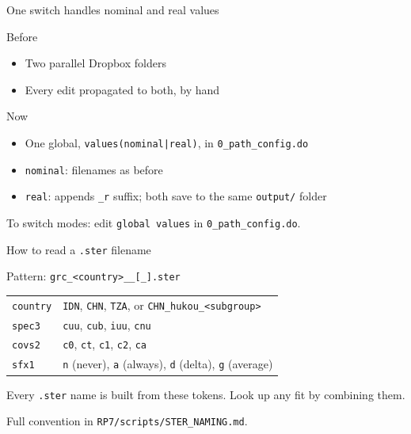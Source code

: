 \documentclass[10pt,aspectratio=169]{beamer}
\newcommand{\code}[1]{\texttt{\small #1}}
\begin{document}
\begin{frame}{One switch handles nominal and real values}

\textcolor{cktgray}{Before}
\begin{itemize}\setlength\itemsep{2pt}
    \item Two parallel Dropbox folders
    \item Every edit propagated to both, by hand
\end{itemize}

\medskip
\textcolor{cktblue}{Now}
\begin{itemize}\setlength\itemsep{2pt}
    \item One global, \code{values(nominal|real)}, in \code{0\_path\_config.do}
    \item \code{nominal}: filenames as before
    \item \code{real}: appends \code{\_r} suffix; both save to the same \code{output/} folder
\end{itemize}

\medskip
\textcolor{cktblue}{To switch modes}: edit \code{global values} in \code{0\_path\_config.do}.

\end{frame}

\begin{frame}{How to read a \code{.ster} filename}

\textcolor{cktblue}{Pattern}: \code{grc\_<country>\_<spec3>\_<covs2>[\_<sfx1>].ster}

\bigskip
\begin{tabular}{l l}
\code{country} & \code{IDN}, \code{CHN}, \code{TZA}, or \code{CHN\_hukou\_<subgroup>} \\
\code{spec3}   & \code{cuu}, \code{cub}, \code{iuu}, \code{cnu} \\
\code{covs2}   & \code{c0}, \code{ct}, \code{c1}, \code{c2}, \code{ca} \\
\code{sfx1}    & \code{n} (never), \code{a} (always), \code{d} (delta), \code{g} (average) \\
\end{tabular}

\bigskip
Every \code{.ster} name is built from these tokens.
Look up any fit by combining them.

\bigskip
Full convention in \code{RP7/scripts/STER\_NAMING.md}.

\end{frame}
\end{document}
